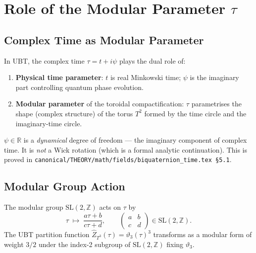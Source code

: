 \documentclass[11pt,a4paper]{article}
\theoremstyle{definition}
\theoremstyle{remark}
\begin{document}
\section{Role of the Modular Parameter $\tau$}\label{sec:modular}

\subsection{Complex Time as Modular Parameter}

In UBT, the complex time $\tau = t + i\psi$ plays the dual role of:
\begin{enumerate}
  \item \textbf{Physical time parameter}: $t$ is real Minkowski time; $\psi$
    is the imaginary part controlling quantum phase evolution.
  \item \textbf{Modular parameter} of the toroidal compactification: $\tau$
    parametrises the shape (complex structure) of the torus $T^2$ formed
    by the time circle and the imaginary-time circle.
\end{enumerate}

\begin{tcolorbox}[colback=yellow!5!white,colframe=orange!60!black,title=Important: $\psi$ is NOT Wick rotation]
$\psi \in \mathbb{R}$ is a \emph{dynamical} degree of freedom — the imaginary
component of complex time.  It is \emph{not} a Wick rotation (which is a formal
analytic continuation).  This is proved in
\texttt{canonical/THEORY/math/fields/biquaternion\_time.tex \S5.1}.
\end{tcolorbox}

\subsection{Modular Group Action}

The modular group $\mathrm{SL}(2,\mathbb{Z})$ acts on $\tau$ by
\begin{equation}
  \tau \;\mapsto\; \frac{a\tau + b}{c\tau + d},
  \qquad
  \begin{pmatrix}a&b\\c&d\end{pmatrix} \in \mathrm{SL}(2,\mathbb{Z}).
\end{equation}
The UBT partition function $\hat{Z}_{T^3}(\tau) = \vartheta_3(\tau)^3$ transforms
as a modular form of weight $3/2$ under the index-2 subgroup of
$\mathrm{SL}(2,\mathbb{Z})$ fixing $\vartheta_3$.
\end{document}
